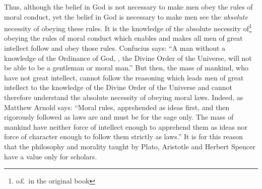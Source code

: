 Thus, although the belief in God is not necessary to make men obey the rules of moral conduct, yet the belief in God is necessary to make men see the \emph{absolute} necessity of obeying these rules.
It is the knowledge of the absolute necessity of\footnote{o\pounds\, in the original book} obeying the rules of moral conduct which enables and makes all men of great intellect follow and obey those rules.
Confucius says: ``A man without a knowledge of the Ordinance of God, \ie, the Divine Order of the Universe, will not be able to be a gentleman or moral man.''\cite{num17}
But then, the mass of mankind, who have not great intellect, cannot follow the reasoning which leads men of great intellect to the knowledge of the Divine Order of the Universe and cannot therefore understand the absolute necessity of obeying moral laws.
Indeed, as Matthew Arnold says: ``Moral rules, apprehended as ideas first, and then rigorously followed as laws are and must be for the sage only. The mass of mankind have neither force of intellect enough to apprehend them as ideas nor force of character enough to follow them strictly as laws.''
It is for this reason that the philosophy and morality taught by Plato, Aristotle and Herbert Spencer have a value only for scholars.

